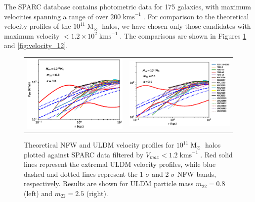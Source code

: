 \documentclass[a4paper,11pt]{article}
\begin{document}
The SPARC database contains photometric data for 175 galaxies, with maximum velocities spanning a range of over $200 \operatorname{kms}^{-1}$. For comparison to the theoretical velocity profiles of the $10^{11}\operatorname{M}_{\odot}$ halos, we have chosen only those candidates with maximum velocity $< 1.2\times 10^2 \operatorname{kms}^{-1}$. The comparisons are shown in Figures \ref{fig:velocity_11} and \ref{fig:velocity_12}.


\begin{figure}
\begin{tabular}{cc}
{\includegraphics[scale = 0.65, trim={2.5cm 2.5cm 2.1cm 0.5cm}]{pics/v_11_8_3_paper.eps}} &
{\includegraphics[scale = 0.65, trim={2.1cm 2.5cm 0cm 0.5cm}]{pics/v_11_25_3_paper.eps}}
\end{tabular}
\caption{Theoretical NFW and ULDM velocity profiles for $10^{11}\operatorname{M}_{\odot}$ halos plotted against SPARC data filtered by $V_{max} < 1.2 \operatorname{kms}^{-1}$. Red solid lines represent the extremal ULDM velocity profiles, while  blue dashed and dotted lines represent the 1-$\sigma$ and 2-$\sigma$ NFW bands, respectively. Results are shown for ULDM particle mass $m_{22} = 0.8$ (left) and $m_{22} = 2.5 $ (right).}\label{fig:velocity_11}
\end{figure}
\end{document}
